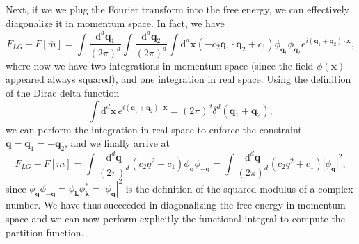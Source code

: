 Next, if we we plug the Fourier transform into the free energy, we can effectively diagonalize it in momentum space. In fact, we have
\[
    F_{LG} - F[\overline{m}] = \int \frac{\mathrm{d}^d \mathbf{q}_1}{(2\pi)^d} \int \frac{\mathrm{d}^d \mathbf{q}_2}{(2\pi)^d} \int \mathrm{d}^d \mathbf{x} \left( -c_2 \mathbf{q}_1 \cdot \mathbf{q}_2 + c_1 \right) \phi_{\mathbf{q}_1} \phi_{\mathbf{q}_2} e^{i(\mathbf{q}_1 + \mathbf{q}_2) \cdot \mathbf{x}},
\]
where now we have two integrations in momentum space (since the field \(\phi(\mathbf{x})\) appeared always squared), and one integration in real space. Using the definition of the Dirac delta function
\[
    \int \mathrm{d}^d \mathbf{x} \, e^{i(\mathbf{q}_1 + \mathbf{q}_2) \cdot \mathbf{x}} = (2\pi)^d \delta^d(\mathbf{q}_1 + \mathbf{q}_2),
\]
we can perform the integration in real space to enforce the constraint \( \mathbf{q} = \mathbf{q}_1 = -\mathbf{q}_2 \), and we finally arrive at
\[
    F_{LG} - F[\overline{m}] = \int \frac{\mathrm{d}^d \mathbf{q}}{(2\pi)^d} (c_2 q^2 + c_1) \phi_{\mathbf{q}} \phi_{-\mathbf{q}} = \int \frac{\mathrm{d}^d \mathbf{q}}{(2\pi)^d} (c_2 q^2 + c_1) |\phi_{\mathbf{q}}|^2,
\]
since \(\phi_{\mathbf{q}} \phi_{-\mathbf{q}} = \phi_{\mathbf{k}} \phi_{\mathbf{k}}^* = |\phi_{\mathbf{q}}|^2\) is the definition of the squared modulus of a complex number. We have thus succeeded in diagonalizing the free energy in momentum space and we can now perform explicitly the functional integral to compute the partition function.

